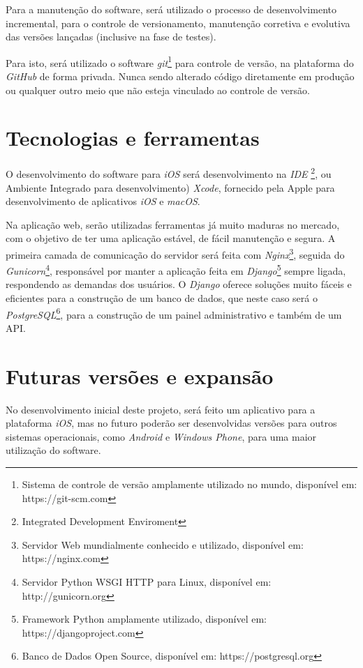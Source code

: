 \documentclass[
	12pt,
	oneside,
	a4paper,
	english,
	brazil,
]{abntex2}
\begin{document}
Para a manutenção do software, será utilizado o processo de desenvolvimento incremental, para o controle de versionamento, manutenção corretiva e evolutiva das versões lançadas (inclusive na fase de testes).

Para isto, será utilizado o software \emph{git}\footnote{Sistema de controle de versão amplamente utilizado no mundo, disponível em: https://git-scm.com} para controle de versão, na plataforma do \emph{GitHub} de forma privada. Nunca sendo alterado código diretamente em produção ou qualquer outro meio que não esteja vinculado ao controle de versão.

\section{Tecnologias e ferramentas}

O desenvolvimento do software para \emph{iOS} será desenvolvimento na \emph{IDE} \footnote{Integrated Development Enviroment}, ou Ambiente Integrado para desenvolvimento) \emph{Xcode}, fornecido pela Apple para desenvolvimento de aplicativos \emph{iOS} e \emph{macOS}.

Na aplicação web, serão utilizadas ferramentas já muito maduras no mercado, com o objetivo de ter uma aplicação estável, de fácil manutenção e segura. A primeira camada de comunicação do servidor será feita com \emph{Nginx}\footnote{Servidor Web mundialmente conhecido e utilizado, disponível em: https://nginx.com}, seguida do \emph{Gunicorn}\footnote{Servidor Python WSGI HTTP para Linux, disponível em: http://gunicorn.org}, responsável por manter a aplicação feita em \emph{Django}\footnote{Framework Python amplamente utilizado, disponível em: https://djangoproject.com} sempre ligada, respondendo as demandas dos usuários. O \emph{Django} oferece soluções muito fáceis e eficientes para a construção de um banco de dados, que neste caso será o \emph{PostgreSQL}\footnote{Banco de Dados Open Source, disponível em: https://postgresql.org}, para a construção de um painel administrativo e também de um API.

\section{Futuras versões e expansão}

No desenvolvimento inicial deste projeto, será feito um aplicativo para a plataforma \emph{iOS}, mas no futuro poderão ser desenvolvidas versões para outros sistemas operacionais, como \emph{Android} e \emph{Windows Phone}, para uma maior utilização do software.
\end{document}
